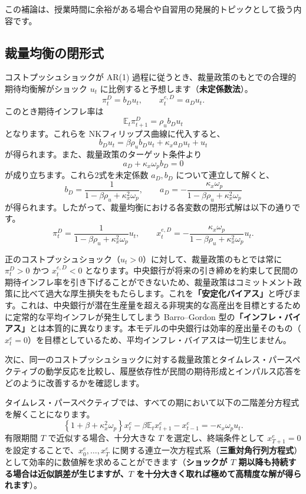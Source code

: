 \documentclass[
  japanese,
  lualatex,
  ja=standard,
  12pt,
  a4paper]{ltjsarticle}
\begin{document}
この補論は、授業時間に余裕がある場合や自習用の発展的トピックとして扱う内容です。

\subsection{裁量均衡の閉形式}\label{ux88c1ux91cfux5747ux8861ux306eux9589ux5f62ux5f0f}

コストプッシュショックが AR(1)
過程に従うとき、裁量政策のもとでの合理的期待均衡解がショック \(u_t\)
に比例すると予想します（\textbf{未定係数法}）。 \[
\pi_t^D=b_Du_t,
\qquad
x_t^{e,D}=a_Du_t.
\] このとき期待インフレ率は \[
\mathbb{E}_t\pi_{t+1}^D
=
\rho_u b_Du_t
\] となります。これらを NKフィリップス曲線に代入すると、 \[
b_Du_t
=
\beta\rho_u b_Du_t
+\kappa_x a_Du_t
+u_t
\] が得られます。また、裁量政策のターゲット条件より \[
a_D+\kappa_x\omega_p b_D=0
\] が成り立ちます。これら2式を未定係数 \(a_D, b_D\)
について連立して解くと、 \[
b_D
=
\frac{1}
{1-\beta\rho_u+\kappa_x^2\omega_p},
\qquad
a_D
=
-\frac{\kappa_x\omega_p}
{1-\beta\rho_u+\kappa_x^2\omega_p}
\]
が得られます。したがって、裁量均衡における各変数の閉形式解は以下の通りです。
\[
\pi_t^D
=
\frac{1}
{1-\beta\rho_u+\kappa_x^2\omega_p}
u_t,
\qquad
x_t^{e,D}
=
-\frac{\kappa_x\omega_p}
{1-\beta\rho_u+\kappa_x^2\omega_p}
u_t.
\]

正のコストプッシュショック（\(u_t>0\)）に対して、裁量政策のもとでは常に
\(\pi_t^D>0\) かつ \(x_t^{e,D}<0\)
となります。中央銀行が将来の引き締めを約束して民間の期待インフレ率を引き下げることができないため、裁量政策はコミットメント政策に比べて過大な厚生損失をもたらします。これを\textbf{「安定化バイアス」}と呼びます。これは、中央銀行が潜在生産量を超える非現実的な高産出を目標とするために定常的な平均インフレが発生してしまう
Barro--Gordon
型の\textbf{「インフレ・バイアス」}とは本質的に異なります。本モデルの中央銀行は効率的産出量そのもの（\(x_t^e=0\)）を目標としているため、平均インフレ・バイアスは一切生じません。

次に、同一のコストプッシュショックに対する裁量政策とタイムレス・パースペクティブの動学反応を比較し、履歴依存性が民間の期待形成とインパルス応答をどのように改善するかを確認します。

タイムレス・パースペクティブでは、すべての期において以下の二階差分方程式を解くことになります。
\[
\left\{
1+\beta+\kappa_x^2\omega_p
\right\}x_t^e
-
\beta\mathbb{E}_t x_{t+1}^e
-
x_{t-1}^e
=
-\kappa_x\omega_p u_t.
\] 有限期間 \(T\) で近似する場合、十分大きな \(T\)
を選定し、終端条件として \(x_{T+1}^e=0\)
を設定することで、\(x_0^e, \ldots, x_T^e\)
に関する連立一次方程式系（\textbf{三重対角行列方程式}）として効率的に数値解を求めることができます（\textbf{ショックが
\(T\) 期以降も持続する場合は近似誤差が生じますが、\(T\)
を十分大きく取れば極めて高精度な解が得られます}）。
\end{document}
